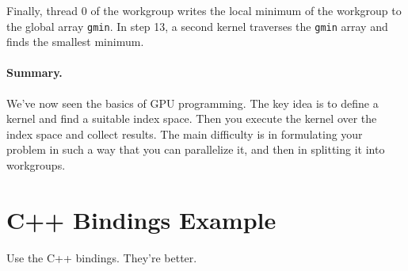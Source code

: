 Finally, thread 0 of the workgroup writes the local minimum of the
workgroup to the global array {\tt gmin}. In step 13, a second kernel
traverses the {\tt gmin} array and finds the smallest minimum.

\paragraph{Summary.} We've now seen the basics of GPU programming.
The key idea is to define a kernel and find a suitable index space.
Then you execute the kernel over the index space and collect results.
The main difficulty is in formulating your problem in such a way that
you can parallelize it, and then in splitting it into workgroups.


\section*{C++ Bindings Example}
Use the C++ bindings. They're better.

